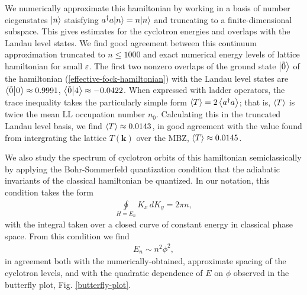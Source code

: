 \documentclass[aps,prb,twocolumn,letterpaper,twoside,nobalancelastpage,groupedaddress,amsmath,amssymb,floatfix,citeautoscript]{revtex4-1}
\begin{document}
We numerically approximate this hamiltonian by working in a basis of number eiegenstates $\ket{n}$ staisfying $a^{\dag}a{\ket{n}}=n{\ket{n}}$ and truncating to a finite-dimensional subspace. This gives estimates for the cyclotron energies and overlaps with the Landau level states. We find good agreement between this continuum approximation truncated to $n \leq 1000$ and exact numerical energy levels of lattice hamiltonian for small $\varepsilon$. The first two nonzero overlaps of the ground state $\ket{\tilde{0}}$ of the hamiltonian (\ref{effective-fock-hamiltonian}) with the Landau level states are $\braket{\tilde{0}}{0}\approx0.9991$, $\braket{\tilde{0}}{4}\approx-0.0422$. When expressed with ladder operators, the trace inequality takes the particularly simple form $\expval{T} = 2\expval{a^{\dag}a}$\cite{bauer_quantum_2016}; that is, $\expval{T}$ is twice the mean LL occupation number $n_0$. Calculating this in the truncated Landau level basis, we find $\expval{T} \approx0.0143$, in good agreement with the value found from intergrating the lattice $T(\mathbf{k})$ over the MBZ, $\expval{T} \approx 0.0145$.

We also study the spectrum of cyclotron orbits of this hamiltonian semiclassically by applying the Bohr-Sommerfeld quantization condition that the adiabatic invariants of the classical hamiltonian be quantized. In our notation, this condition takes the form
\begin{align*}
\oint\limits_{H=E_n} K_x\, dK_y = 2\pi n,
\end{align*}
with the integral taken over a closed curve of constant energy in classical phase space. From this condition we find
\begin{align*}
E_n \sim n^2\phi^2, 
\end{align*}
in agreement both with the numerically-obtained, approximate spacing of the cyclotron levels, and with the quadratic dependence of $E$ on $\phi$ observed in the butterfly plot, Fig. \ref{butterfly-plot}.
\end{document}
